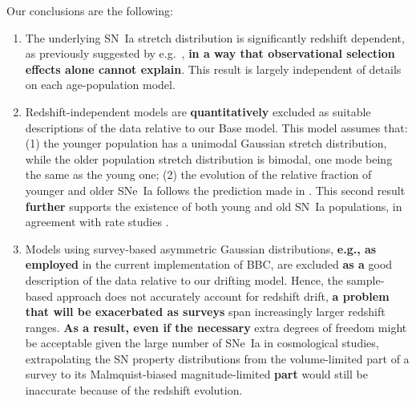 \documentclass[]{aa}
\begin{document}
Our conclusions are the following:
\begin{enumerate}

    \item The underlying SN~Ia stretch distribution is significantly redshift
        dependent, as previously suggested by e.g.~\cite{howell2007}, \textbf{in
        a way that observational selection effects alone cannot explain}. This
        result is largely independent of details on each age-population model.
    
    \item Redshift-independent models are \textbf{quantitatively} excluded as
        suitable descriptions of the data relative to our Base model. This model
        assumes that: (1) the younger population has a unimodal Gaussian stretch
        distribution, while the older population stretch distribution is
        bimodal, one mode being the same as the young one; (2) the evolution of
        the relative fraction of younger and older SNe~Ia follows the prediction
        made in \cite{rigault2020}. This second result \textbf{further} supports
        the existence of both young and old SN~Ia populations, in agreement with
        rate studies \cite{mannucci2005, scannapieco2005, sullivan2006,
        aubourg2008}. 
        
    \item Models using survey-based asymmetric Gaussian distributions,
        \textbf{e.g., as employed} in the current implementation of BBC, are
        excluded \textbf{as a} good description of the data relative to our
        drifting model. Hence, the sample-based approach does not accurately
        account for redshift drift, \textbf{a problem that will be exacerbated
        as surveys} span increasingly larger redshift ranges. \textbf{As a
    result, even if the necessary} extra degrees of freedom might be acceptable
    given the large number of SNe~Ia in cosmological studies, extrapolating the
    SN property distributions from the volume-limited part of a survey to its
    Malmquist-biased magnitude-limited \textbf{part} would still be inaccurate
    because of the redshift evolution.


\end{enumerate}
\end{document}
